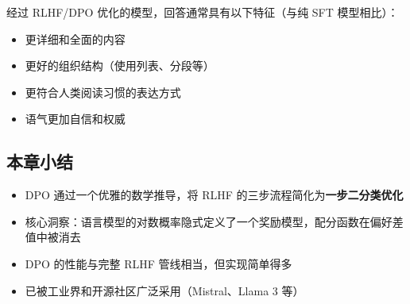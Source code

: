 经过 RLHF/DPO 优化的模型，回答通常具有以下特征（与纯 SFT 模型相比）：
\begin{itemize}
    \item 更详细和全面的内容
    \item 更好的组织结构（使用列表、分段等）
    \item 更符合人类阅读习惯的表达方式
    \item 语气更加自信和权威
\end{itemize}

\subsection{本章小结}

\begin{itemize}
    \item DPO 通过一个优雅的数学推导，将 RLHF 的三步流程简化为\textbf{一步二分类优化}
    \item 核心洞察：语言模型的对数概率隐式定义了一个奖励模型，配分函数在偏好差值中被消去
    \item DPO 的性能与完整 RLHF 管线相当，但实现简单得多
    \item 已被工业界和开源社区广泛采用（Mistral、Llama 3 等）
\end{itemize}


